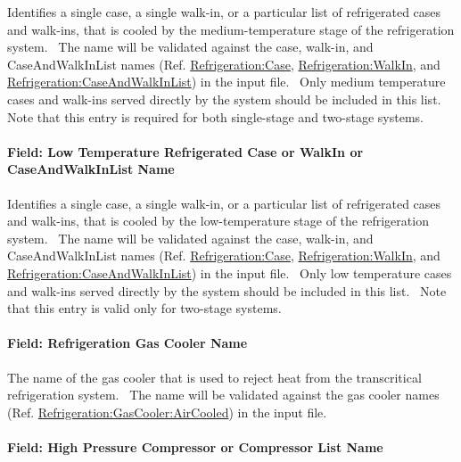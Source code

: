 Identifies a single case, a single walk-in, or a particular list of refrigerated cases and walk-ins, that is cooled by the medium-temperature stage of the refrigeration system.~ The name will be validated against the case, walk-in, and CaseAndWalkInList names (Ref. \hyperref[refrigerationcase]{Refrigeration:Case}, \hyperref[refrigerationwalkin]{Refrigeration:WalkIn}, and \hyperref[refrigerationcaseandwalkinlist]{Refrigeration:CaseAndWalkInList}) in the input file.~ Only medium temperature cases and walk-ins served directly by the system should be included in this list.~ Note that this entry is required for both single-stage and two-stage systems.

\paragraph{Field: Low Temperature Refrigerated Case or WalkIn or CaseAndWalkInList Name}\label{field-low-temperature-refrigerated-case-or-walkin-or-caseandwalkinlist-name}

Identifies a single case, a single walk-in, or a particular list of refrigerated cases and walk-ins, that is cooled by the low-temperature stage of the refrigeration system.~ The name will be validated against the case, walk-in, and CaseAndWalkInList names (Ref. \hyperref[refrigerationcase]{Refrigeration:Case}, \hyperref[refrigerationwalkin]{Refrigeration:WalkIn}, and \hyperref[refrigerationcaseandwalkinlist]{Refrigeration:CaseAndWalkInList}) in the input file.~ Only low temperature cases and walk-ins served directly by the system should be included in this list.~ Note that this entry is valid only for two-stage systems.

\paragraph{Field: Refrigeration Gas Cooler Name}\label{field-refrigeration-gas-cooler-name}

The name of the gas cooler that is used to reject heat from the transcritical refrigeration system.~ The name will be validated against the gas cooler names (Ref. \hyperref[refrigerationgascooleraircooled]{Refrigeration:GasCooler:AirCooled}) in the input file.

\paragraph{Field: High Pressure Compressor or Compressor List Name}\label{field-high-pressure-compressor-or-compressor-list-name}

